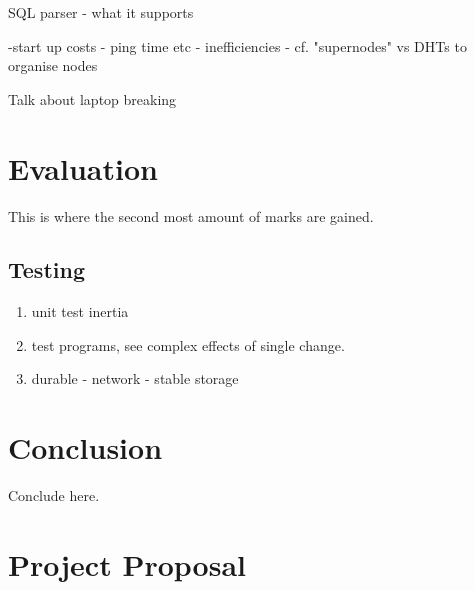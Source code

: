 \documentclass[12pt,twoside,notitlepage]{report}
\begin{document}
SQL parser
- what it supports

-start up costs
  - ping time etc
  - inefficiencies
  - cf. "supernodes" vs DHTs to organise nodes

Talk about laptop breaking


\cleardoublepage
\chapter{Evaluation}

This is where the second most amount of marks are gained.

\section{Testing}

\begin{enumerate}
	\item unit test inertia
	\item test programs, see complex effects of single change.
	\item durable - network - stable storage
\end{enumerate}



\cleardoublepage
\chapter{Conclusion}

Conclude here.




\cleardoublepage



\cleardoublepage

\appendix

\chapter{Project Proposal}


\end{document}
